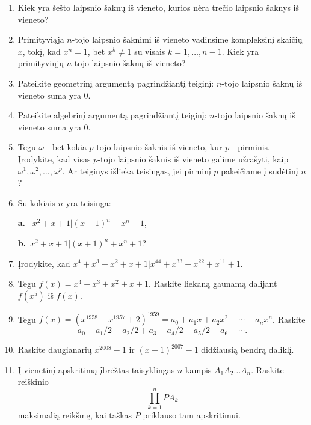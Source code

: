 \begin{enumerate}

\item Kiek yra šešto laipsnio šaknų iš vieneto, kurios nėra trečio laipsnio šaknys iš vieneto?

\item Primityviąja $n$-tojo laipsnio šaknimi iš vieneto vadinsime kompleksinį skaičių $x$, tokį, kad $x^n = 1$, bet $x^k \neq 1$ su visais $k=1,\dots,n-1.$ Kiek yra primityviųjų $n$-tojo laipsnio šaknų iš vieneto?

\item Pateikite geometrinį argumentą pagrindžiantį teiginį: $n$-tojo laipsnio šaknų iš vieneto suma yra $0$.

\item Pateikite algebrinį argumentą pagrindžiantį teiginį: $n$-tojo laipsnio šaknų iš vieneto suma yra $0$.

\item Tegu $\omega$ - bet kokia $p$-tojo laipsnio šaknis iš vieneto, kur $p$ - pirminis. Įrodykite, kad visas $p$-tojo laipsnio šaknis iš vieneto galime užrašyti, kaip $\omega^1, \omega^2, \dots, \omega^p$. Ar teiginys išlieka teisingas, jei pirminį $p$ pakeičiame į sudėtinį $n$? 

\item Su kokiais $n$ yra teisinga:

{\bf a.} \ $x^2 + x + 1|(x-1)^n - x^n - 1$,

{\bf b.} \,$x^2 + x + 1|(x+1)^n + x^n + 1$?
 
\item Įrodykite, kad $x^4 + x^3 + x^2 + x + 1|x^{44} + x^{33} + x^{22} + x^{11} + 1.$

\item Tegu $f(x) = x^4 + x^3 + x^2 + x +1.$ Raskite liekaną gaunamą dalijant $f(x^5)$ iš $f(x).$

\item Tegu $f(x) = (x^{1958} + x^{1957} + 2)^{1959} = a_0 + a_1x + a_2x^2 + \cdots + a_nx^n$. Raskite
$$a_0 - a_1/2 -a_2/2 + a_3 -a_4/2 -a_5/2 + a_6 - \cdots.$$

\item Raskite daugianarių $x^{2008} - 1$ ir $(x-1)^{2007} - 1$ didžiausią bendrą daliklį.

\item Į vienetinį apskritimą įbrėžtas taisyklingas $n$-kampis $A_1A_2\dots A_{n}$. Raskite reiškinio 
$$\prod_{k=1}^{n} PA_k$$ maksimalią reikšmę, kai taškas $P$ priklauso tam apskritimui. 


\end{enumerate}
